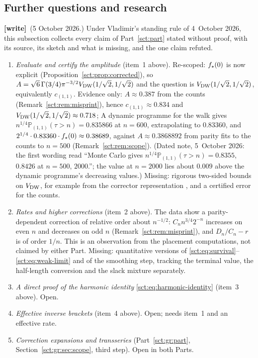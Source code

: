\documentclass[11pt,letterpaper]{article}
\theoremstyle{definition}\newtheorem{remark}[theorem]{Remark}
\newcommand{\Pp}{\mathbb P}\newcommand{\Ee}{\mathbb E}
\newcommand{\wtag}{\textup{\textbf{[write]}}}
\begin{document}
\subsection{Further questions and research}\label{sct:sub:further}
\wtag\ (5 October 2026.) Under Vladimir's standing rule of 4~October 2026, this subsection collects every claim of Part~\ref{sct:part} stated without proof, with its source, its sketch and what is missing, and the one claim refuted.
\begin{enumerate}
\item \emph{Evaluate and certify the amplitude} (item~1 above). Re-scoped: $f_\star(0)$ is now explicit (Proposition~\ref{sct:prop:corrected}), so $A=\sqrt6\,\Gamma(3/4)\pi^{-3/2}V_{\mathrm{DW}}(1/\sqrt2,1/\sqrt2)$ and the question is $V_{\mathrm{DW}}(1/\sqrt2,1/\sqrt2)$, equivalently $c_{(1,1)}$. Evidence only: $A\approx0.387$ from the counts (Remark~\ref{sct:rem:misprint}), hence $c_{(1,1)}\approx0.834$ and $V_{\mathrm{DW}}(1/\sqrt2,1/\sqrt2)\approx0.718$; A dynamic programme for the walk gives $n^{1/4}\Pp_{(1,1)}(\tau>n)=0.835866$ at $n=600$, extrapolating to $0.83360$, and $2^{1/4}\cdot0.83360\cdot f_\star(0)\approx0.38689$, against $A\approx0.3868892$ from parity fits to the counts to $n=500$ (Remark~\ref{sct:rem:scope}). (Dated note, 5~October 2026: the first wording read ``Monte Carlo gives $n^{1/4}\Pp_{(1,1)}(\tau>n)=0.8355$, $0.8426$ at $n=500$, $2000$.''; the value at $n=2000$ lies about $0.009$ above the dynamic programme's decreasing values.) Missing: rigorous two-sided bounds on $V_{\mathrm{DW}}$, for example from the corrector representation \cite[Proposition~4]{dw}, and a certified error for the counts.
\item \emph{Rates and higher corrections} (item~2 above). The data show a parity-dependent correction of relative order about $n^{-1/2}$: $C_nn^{3/4}2^{-n}$ increases on even $n$ and decreases on odd $n$ (Remark~\ref{sct:rem:misprint}), and $D_n/C_n-r$ is of order $1/n$. This is an observation from the placement computations, not claimed by either Part. Missing: quantitative versions of \eqref{sct:eq:survival}--\eqref{sct:eq:weak-limit} and of the smoothing step, tracking the terminal value, the half-length conversion and the slack mixture separately.
\item \emph{A direct proof of the harmonic identity} \eqref{sct:eq:harmonic-identity} (item~3 above). Open.
\item \emph{Effective inverse brackets} (item~4 above). Open; needs item~1 and an effective rate.
\item \emph{Correction expansions and transseries} (Part~\ref{sct:gr:part}, Section~\ref{sct:gr:sec:scope}, third step). Open in both Parts.

\end{enumerate}
\end{document}

